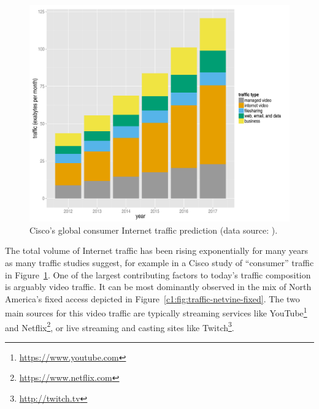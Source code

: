\begin{figure}[htb]
    \centering
    \includegraphics[width=1.0\textwidth]{images/r-cisco-vni-2013.pdf}
    \caption{Cisco's global consumer Internet traffic prediction (data source: \cite{cisco2013VNI}).}
\label{c1:fig:traffic-cisco}
\end{figure}

The total volume of Internet traffic has been rising exponentially for many years as many traffic studies suggest, for example in a Cisco study of ``consumer'' traffic in Figure~\ref{c1:fig:traffic-cisco}. One of the largest contributing factors to today's traffic composition is arguably video traffic. It can be most dominantly observed in the mix of North America's fixed access depicted in Figure~\ref{c1:fig:traffic-netvine-fixed}. The two main sources for this video traffic are typically streaming services like YouTube\footnote{\url{https://www.youtube.com}} and Netflix\footnote{\url{https://www.netflix.com}}, or live streaming and casting sites like Twitch\footnote{\url{http://twitch.tv}}. 

